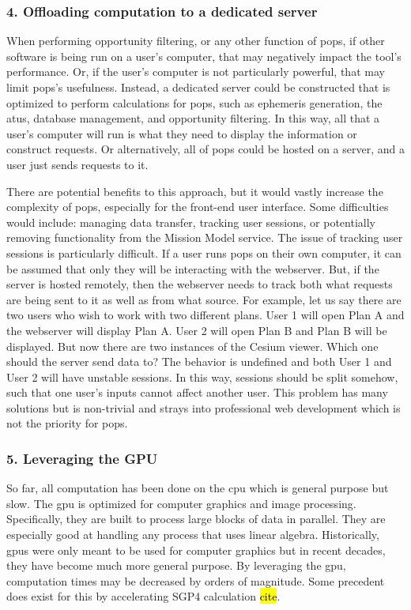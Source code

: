 \subsubsection{4. Offloading computation to a dedicated server}

When performing opportunity filtering, or any other function of \gls{pops}, if
other software is being run on a user's computer, that may negatively impact
the tool's performance. Or, if the user's computer is not particularly
powerful, that may limit \gls{pops}'s usefulness. Instead, a dedicated server
could be constructed that is optimized to perform calculations for \gls{pops},
such as ephemeris generation, the \glspl{atu}, database management, and
opportunity filtering. In this way, all that a user's computer will run is what
they need to display the information or construct requests. Or alternatively,
all of \gls{pops} could be hosted on a server, and a user just sends requests
to it. 

There are potential benefits to this approach, but it would vastly increase the
complexity of \gls{pops}, especially for the front-end user interface. Some
difficulties would include: managing data transfer, tracking user sessions, or
potentially removing functionality from the Mission Model service. The issue of
tracking user sessions is particularly difficult. If a user runs \gls{pops} on
their own computer, it can be assumed that only they will be interacting with
the webserver. But, if the server is hosted remotely, then the webserver needs
to track both what requests are being sent to it as well as from what source.
For example, let us say there are two users who wish to work with two different
plans. User 1 will open Plan A and the webserver will display Plan A. User 2
will open Plan B and Plan B will be displayed. But now there are two instances
of the Cesium viewer. Which one should the server send data to? The behavior is
undefined and both User 1 and User 2 will have unstable sessions. In this way,
sessions should be split somehow, such that one user's inputs cannot affect
another user. This problem has many solutions but is non-trivial and strays
into professional web development which is not the priority for \gls{pops}. 


\subsubsection{5. Leveraging the GPU}

So far, all computation has been done on the \gls{cpu} which is general purpose
but slow. The \gls{gpu} is optimized for computer graphics and image
processing. Specifically, they are built to process large blocks of data in
parallel. They are especially good at handling any process that uses linear
algebra. Historically, \glspl{gpu} were only meant to be used for computer
graphics but in recent decades, they have become much more general purpose. By
leveraging the \gls{gpu}, computation times may be decreased by orders of
magnitude. Some precedent does exist for this by accelerating SGP4 calculation
\hl{cite}.

